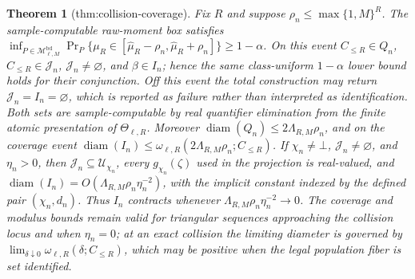 \documentclass{article}
\newtheorem{theorem}{Theorem}
\begin{document}
\begin{theorem}[thm:collision-coverage]\label{thm:collision-coverage}
Fix \(R\) and suppose \(\rho_n\le\max\{1,M\}^{R}\). The sample-computable raw-moment box satisfies \(\inf_{P\in\mathcal M^{\mathrm{bd}}_{\ell,M}}\Pr_P\{\mu_R\in[\widehat\mu_R-\rho_n,\widehat\mu_R+\rho_n]\}\ge1-\alpha\). On this event \(C_{\le R}\in Q_n\), \(C_{\le R}\in\mathcal J_n\), \(\mathcal J_n\ne\varnothing\), and \(\beta\in I_n\); hence the same class-uniform \(1-\alpha\) lower bound holds for their conjunction. Off this event the total construction may return \(\mathcal J_n=I_n=\varnothing\), which is reported as failure rather than interpreted as identification. Both sets are sample-computable by real quantifier elimination from the finite atomic presentation of \(\Theta_{\ell,R}\). Moreover \(\operatorname{diam}(Q_n)\le2\Lambda_{R,M}\rho_n\), and on the coverage event \(\operatorname{diam}(I_n)\le\omega_{\ell,R}(2\Lambda_{R,M}\rho_n;C_{\le R})\). If \(\chi_n\ne\bot\), \(\mathcal J_n\ne\varnothing\), and \(\eta_n>0\), then \(\mathcal J_n\subseteq\mathcal U_{\chi_n}\), every \(g_{\chi_n}(\zeta)\) used in the projection is real-valued, and \(\operatorname{diam}(I_n)=O(\Lambda_{R,M}\rho_n\eta_n^{-2})\), with the implicit constant indexed by the defined pair \((\chi_n,d_n)\). Thus \(I_n\) contracts whenever \(\Lambda_{R,M}\rho_n\eta_n^{-2}\to0\). The coverage and modulus bounds remain valid for triangular sequences approaching the collision locus and when \(\eta_n=0\); at an exact collision the limiting diameter is governed by \(\lim_{\delta\downarrow0}\omega_{\ell,R}(\delta;C_{\le R})\), which may be positive when the legal population fiber is set identified.
\end{theorem}
\end{document}
